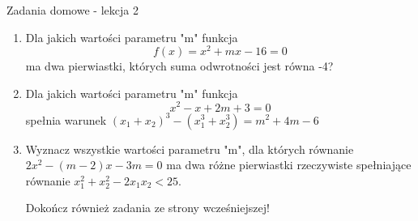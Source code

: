\documentclass[12pt,a4paper]{article}
\begin{document}
	\newpage
	
	\begin{center}
		\LARGE Zadania domowe - lekcja 2
	\end{center}
	\vspace{1.5cm}
	
	\begin{enumerate}[1.]

	\item Dla jakich wartości parametru "m" funkcja
	$$f(x)=x^2+mx-16=0$$
	ma dwa pierwiastki, których suma odwrotności jest równa -4?
	
	\item Dla jakich wartości parametru "m" funkcja
	$$x^2-x+2m+3=0$$
	spełnia warunek $(x_1+x_2)^3-(x_1^3+x_2^3)=m^2+4m-6$
	
	\item Wyznacz wszystkie wartości parametru "m", dla których równanie $2x^2-(m-2)x-3m=0$ ma dwa różne pierwiastki rzeczywiste spełniające równanie $x_1^2+x_2^2-2x_1x_2<25$.
	
	\vspace{2cm}
	\Large Dokończ również zadania ze strony wcześniejszej!
	\end{enumerate}
	
	
	
\end{document}
